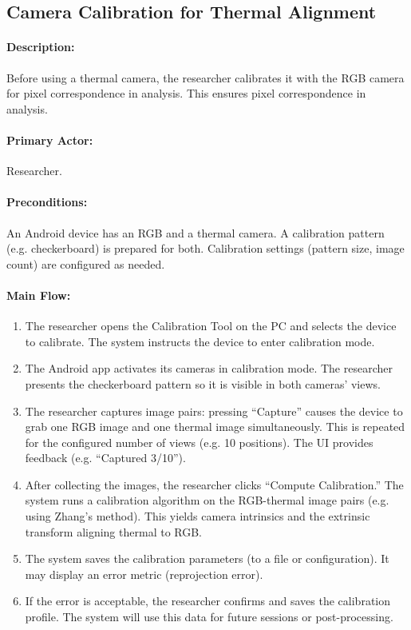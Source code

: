 \subsection{Camera Calibration for Thermal Alignment}

\paragraph{Description:} Before using a thermal camera, the researcher calibrates it with the RGB camera for pixel correspondence in analysis. This ensures pixel correspondence in analysis.

\paragraph{Primary Actor:} Researcher.

\paragraph{Preconditions:} An Android device has an RGB and a thermal camera. A calibration pattern (e.g. checkerboard) is prepared for both. Calibration settings (pattern size, image count) are configured as needed.

\paragraph{Main Flow:}
\begin{enumerate}
    \item The researcher opens the Calibration Tool on the PC and selects the device to calibrate. The system instructs the device to enter calibration mode.
    \item The Android app activates its cameras in calibration mode. The researcher presents the checkerboard pattern so it is visible in both cameras’ views.
    \item The researcher captures image pairs: pressing “Capture” causes the device to grab one RGB image and one thermal image simultaneously. This is repeated for the configured number of views (e.g. 10 positions). The UI provides feedback (e.g. “Captured 3/10”).
    \item After collecting the images, the researcher clicks “Compute Calibration.” The system runs a calibration algorithm on the RGB-thermal image pairs (e.g. using Zhang’s method). This yields camera intrinsics and the extrinsic transform aligning thermal to RGB.
    \item The system saves the calibration parameters (to a file or configuration). It may display an error metric (reprojection error).
    \item If the error is acceptable, the researcher confirms and saves the calibration profile. The system will use this data for future sessions or post-processing.
\end{enumerate}

